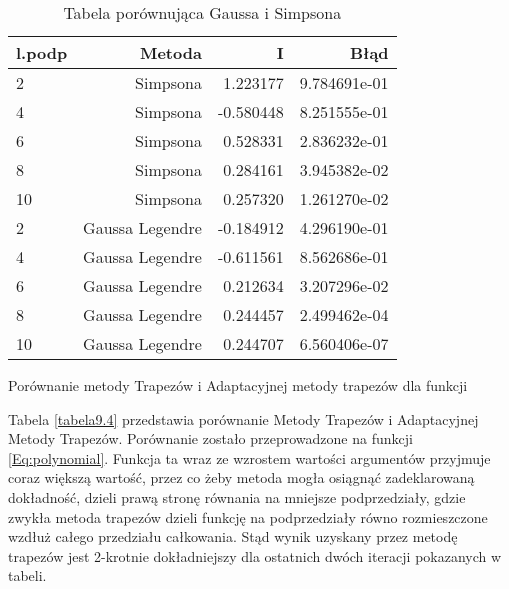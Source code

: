 \documentclass[12pt,twoside]{article}
\begin{document}
\begin{table}[h]
\centering 
\caption{Tabela porównująca Gaussa i Simpsona }
\label{tabela9.3}
\begin{tabular}{lrrr}
\toprule
{l.podp} & Metoda &  I &  Błąd \\
\midrule
2  &     Simpsona & 1.223177 &   9.784691e-01 \\
4  &     Simpsona & -0.580448  &   8.251555e-01  \\
6  &     Simpsona &  0.528331  &   2.836232e-01  \\
8  &     Simpsona & 0.284161 &   3.945382e-02  \\
10 &     Simpsona & 0.257320 &   1.261270e-02  \\
\midrule
2  &     Gaussa Legendre & -0.184912 &  4.296190e-01   \\
4  &     Gaussa Legendre & -0.611561 &  8.562686e-01   \\
6  &     Gaussa Legendre & 0.212634 &  3.207296e-02   \\
8  &     Gaussa Legendre & 0.244457 &  2.499462e-04  \\
10 &     Gaussa Legendre & 0.244707 &  6.560406e-07  \\

\bottomrule
\end{tabular}
\end{table}




Porównanie metody Trapezów i Adaptacyjnej metody trapezów dla funkcji 

Tabela \eqref{tabela9.4} przedstawia porównanie Metody Trapezów i Adaptacyjnej Metody Trapezów. Porównanie zostało przeprowadzone na funkcji \eqref{Eq:polynomial}. Funkcja ta wraz ze wzrostem wartości argumentów przyjmuje coraz większą wartość, przez co żeby metoda mogła osiągnąć zadeklarowaną dokładność, dzieli prawą stronę równania na mniejsze podprzedziały, gdzie zwykła metoda trapezów dzieli funkcję na podprzedziały równo rozmieszczone wzdłuż całego przedziału całkowania. Stąd wynik uzyskany przez metodę trapezów jest 2-krotnie dokładniejszy dla ostatnich dwóch iteracji pokazanych w tabeli.
\end{document}
